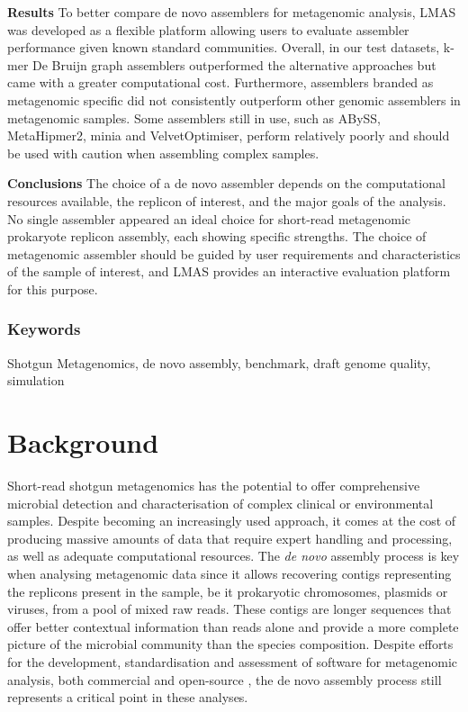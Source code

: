 \textbf{Results} To better compare de novo assemblers for metagenomic analysis, LMAS was developed as a flexible platform allowing users to evaluate assembler performance given known standard communities. Overall, in our test datasets, k-mer De Bruijn graph assemblers outperformed the alternative approaches but came with a greater computational cost. Furthermore, assemblers branded as metagenomic specific did not consistently outperform other genomic assemblers in metagenomic samples. Some assemblers still in use, such as ABySS, MetaHipmer2, minia and VelvetOptimiser, perform relatively poorly and should be used with caution when assembling complex samples. 

\textbf{Conclusions} The choice of a de novo assembler depends on the computational resources available, the replicon of interest, and the major goals of the analysis. No single assembler appeared an ideal choice for short-read metagenomic prokaryote replicon assembly, each showing specific strengths. The choice of metagenomic assembler should be guided by user requirements and characteristics of the sample of interest, and LMAS provides an interactive evaluation platform for this purpose. 

\subsubsection{Keywords}

Shotgun Metagenomics, de novo assembly, benchmark, draft genome quality, simulation

\section{Background}

Short-read shotgun metagenomics has the potential to offer comprehensive microbial detection and characterisation of complex clinical or environmental samples.  Despite becoming an increasingly used approach, it comes at the cost of producing massive amounts of data that require expert handling and processing, as well as adequate computational resources. The \textit{de novo} assembly process is key when analysing metagenomic data since it allows recovering contigs representing the replicons present in the sample, be it prokaryotic chromosomes, plasmids or viruses, from a pool of mixed raw reads. These contigs are longer sequences that offer better contextual information than reads alone and provide a more complete picture of the microbial community than the species composition. Despite efforts for the development, standardisation and assessment of software for metagenomic analysis, both commercial and open-source \cite{angers-loustau_challenges_2018,gruening_recommendations_2019, sczyrba_critical_2017, couto_critical_2018, meyer_critical_2021}, the de novo assembly process still represents a critical point in these analyses.

